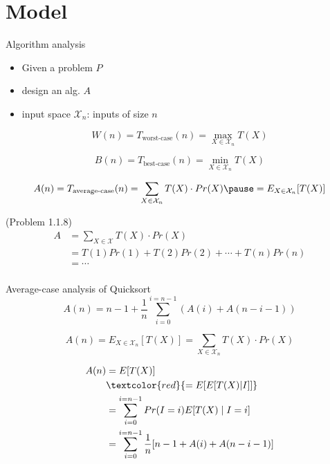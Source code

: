 \section{Model}

\begin{frame}{Algorithm analysis}
  \begin{itemize}
	\item Given a problem $P$
	\item design an alg. $A$
	\item input space $\mathcal{X}_{n}$: inputs of size $n$
  \end{itemize}

  \pause
  \[
	W(n) = T_{\text{worst-case}}(n) = \max_{X \in \mathcal{X}_{n}} T(X)
  \]

  \pause
  \[
	B(n) = T_{\text{best-case}}(n) = \min_{X \in \mathcal{X}_{n}} T(X)
  \]

  \pause
  \[
	A(n) = T_{\text{average-case}}(n) = \sum_{X \in \mathcal{X}_{n}} T(X) \cdot Pr(X) \pause = E_{X \in \mathcal{X}_{n}} [T(X)]
  \]
\end{frame}
\begin{frame}{(Problem 1.1.8)}
  \begin{align*}
	A &= \sum_{X \in \mathcal{X}} T(X) \cdot Pr(X) \\
	  &= T(1) Pr(1) + T(2) Pr(2) + \cdots + T(n) Pr(n) \\
	  &= \cdots  \\
  \end{align*}
\end{frame}
\begin{frame}{Average-case analysis of Quicksort}
  \[
	A(n) = n-1 + \frac{1}{n} \sum_{i=0}^{i=n-1} (A(i) + A(n-i-1))
  \]

  \[
	A(n) = E_{X \in \mathcal{X}_{n}} [T(X)] = \sum_{X \in \mathcal{X}_{n}} T(X) \cdot Pr(X)
  \]

  \pause

  \begin{align*}
	A(n) &= E[T(X)] \\
	    &\textcolor{red}{= E[E[T(X)|I]]} \\
		&= \sum_{i=0}^{i=n-1} Pr(I = i)E[T(X) \mid I = i] \\
		&= \sum_{i=0}^{i=n-1} \frac{1}{n} [n-1 + A(i) + A(n-i-1)]
  \end{align*}
\end{frame}
